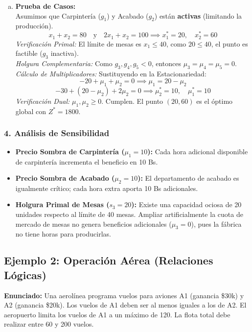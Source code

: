 \documentclass{article}
\begin{document}
\begin{enumerate}[a)]
		\item \textbf{Prueba de Casos:}\\
		Asumimos que Carpintería ($g_1$) y Acabado ($g_2$) están \textbf{activas} (limitando la producción).
		$$ x_1 + x_2 = 80 \quad \text{y} \quad 2x_1 + x_2 = 100 \implies x_1^* = 20, \quad x_2^* = 60 $$
		\textit{Verificación Primal:} El límite de mesas es $x_1 \leq 40$, como $20 \leq 40$, el punto es factible ($g_3$ inactiva).\\
		\textit{Holgura Complementaria:} Como $g_3, g_4, g_5 < 0$, entonces $\mu_3 = \mu_4 = \mu_5 = 0$.\\
		\textit{Cálculo de Multiplicadores:} Sustituyendo en la Estacionariedad:
		$$ -20 + \mu_1 + \mu_2 = 0 \implies \mu_1 = 20 - \mu_2 $$
		$$ -30 + (20 - \mu_2) + 2\mu_2 = 0 \implies \mu_2^* = 10, \quad \mu_1^* = 10 $$
		\textit{Verificación Dual:} $\mu_1, \mu_2 \geq 0$. Cumplen. El punto $(20, 60)$ es el óptimo global con $Z^* = 1800$.
	\end{enumerate}
	
	\subsubsection*{4. Análisis de Sensibilidad}
	\begin{itemize}
		\item \textbf{Precio Sombra de Carpintería ($\mu_1 = 10$):} Cada hora adicional disponible de carpintería incrementa el beneficio en 10 Bs.
		\item \textbf{Precio Sombra de Acabado ($\mu_2 = 10$):} El departamento de acabado es igualmente crítico; cada hora extra aporta 10 Bs adicionales.
		\item \textbf{Holgura Primal de Mesas ($s_3 = 20$):} Existe una capacidad ociosa de 20 unidades respecto al límite de 40 mesas. Ampliar artificialmente la cuota de mercado de mesas no genera beneficios adicionales ($\mu_3 = 0$), pues la fábrica no tiene horas para producirlas.
	\end{itemize}
	
	\newpage
	
	\subsection{Ejemplo 2: Operación Aérea (Relaciones Lógicas)}
	
	\textbf{Enunciado:} Una aerolínea programa vuelos para aviones A1 (ganancia \$30k) y A2 (ganancia \$20k). Los vuelos de A1 deben ser al menos iguales a los de A2. El aeropuerto limita los vuelos de A1 a un máximo de 120. La flota total debe realizar entre 60 y 200 vuelos.
	
\end{document}
